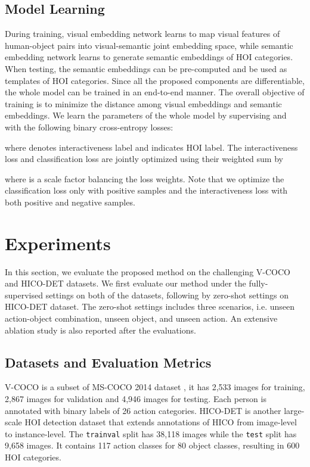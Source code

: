 \documentclass[sigconf,screen]{acmart}
\begin{document}
\subsection{Model Learning}

During training, visual embedding network learns to map visual features of human-object pairs into visual-semantic joint embedding space, while semantic embedding network learns to generate semantic embeddings of HOI categories. When testing, the semantic embeddings can be pre-computed and be used as templates of HOI categories. Since all the proposed components are differentiable, the whole model can be trained in an end-to-end manner. The overall objective of training is to minimize the distance among visual embeddings and semantic embeddings. We learn the parameters of the whole model by supervising  and  with the following binary cross-entropy losses:

where  denotes interactiveness label and  indicates HOI label. The interactiveness loss  and classification loss  are jointly optimized using their weighted sum by

where  is a scale factor balancing the loss weights. Note that we optimize the classification loss only with positive samples and the interactiveness loss with both positive and negative samples.

\section{Experiments}

In this section, we evaluate the proposed method on the challenging V-COCO \cite{gupta2015visual} and HICO-DET \cite{chao2018learning} datasets. We first evaluate our method under the fully-supervised settings on both of the datasets, following by zero-shot settings on HICO-DET dataset. The zero-shot settings includes three scenarios, i.e. unseen action-object combination, unseen object, and unseen action. An extensive ablation study is also reported after the evaluations.

\subsection{Datasets and Evaluation Metrics}

V-COCO is a subset of MS-COCO 2014 dataset \cite{lin2014microsoft}, it has 2,533 images for training, 2,867 images for validation and 4,946 images for testing. Each person is annotated with binary labels of 26 action categories. HICO-DET is another large-scale HOI detection dataset that extends annotations of HICO \cite{chao2015hico} from image-level to instance-level. The \verb|trainval| split has 38,118 images while the \verb|test| split has 9,658 images. It contains 117 action classes for 80 object classes, resulting in 600 HOI categories.
\end{document}
